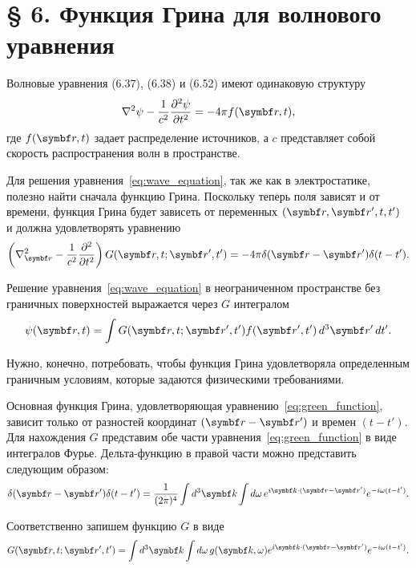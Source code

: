 \documentclass[%
biblatex,
]{ConspectBook}
\begin{document}
\section*{§ 6. Функция Грина для волнового уравнения}

Волновые уравнения (6.37), (6.38) и (6.52) имеют одинаковую структуру
\begin{equation}
\label{eq:wave_equation}
\nabla^2 \psi - \frac{1}{c^2} \frac{\partial^2 \psi}{\partial t^2} = -4\pi f(\vect{r}, t),
\end{equation}
где \( f(\vect{r}, t) \) задает распределение источников, а \( c \) представляет собой скорость распространения волн в пространстве.

Для решения уравнения~\eqref{eq:wave_equation}, так же как в электростатике, полезно найти сначала функцию Грина. Поскольку теперь поля зависят и от
времени, функция Грина будет зависеть от переменных \((\vect{r}, \vect{r}', t, t')\) и должна удовлетворять уравнению
\begin{equation}
\label{eq:green_function}
\left( \nabla_{\vect{r}}^2 - \frac{1}{c^2} \frac{\partial^2}{\partial t^2} \right) G(\vect{r}, t; \vect{r}', t') = -4\pi \delta (\vect{r} -
\vect{r}') \delta (t - t').
\end{equation}

Решение уравнения~\eqref{eq:wave_equation} в неограниченном пространстве без граничных поверхностей выражается через \( G \) интегралом
\begin{equation}
\label{eq:solution}
\psi(\vect{r}, t) = \int G(\vect{r}, t; \vect{r}', t') f(\vect{r}', t') \, d^3 \vect{r}' \, dt'.
\end{equation}

Нужно, конечно, потребовать, чтобы функция Грина удовлетворяла определенным граничным условиям, которые задаются физическими требованиями.

Основная функция Грина, удовлетворяющая уравнению~\eqref{eq:green_function}, зависит только от разностей координат \((\vect{r} - \vect{r}')\)
и времен \((t - t')\). Для нахождения \( G \) представим обе части уравнения~\eqref{eq:green_function} в виде интегралов Фурье. Дельта-функцию в правой
части можно представить следующим образом:
\begin{equation}
\label{eq:delta_fourier}
\delta (\vect{r} - \vect{r}') \delta (t - t') = \frac{1}{(2\pi)^4} \int d^3 \vect{k} \int d\omega \, e^{i \vect{k} \cdot (\vect{r} -
\vect{r}')} e^{-i \omega (t - t')}.
\end{equation}

Соответственно запишем функцию \( G \) в виде
\begin{equation}
\label{eq:green_fourier}
G(\vect{r}, t; \vect{r}', t') = \int d^3 \vect{k} \int d\omega \, g(\vect{k}, \omega) e^{i \vect{k} \cdot (\vect{r} - \vect{r}')} e^{-i
\omega (t - t')}.
\end{equation}
\end{document}
